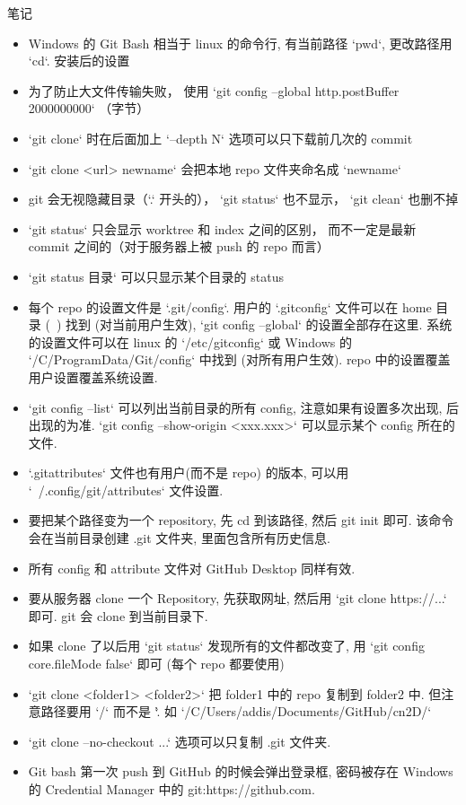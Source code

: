 笔记
\begin{itemize}
\item Windows 的 Git Bash 相当于 linux 的命令行, 有当前路径 `pwd`, 更改路径用 `cd`.
安装后的设置
\item 为了防止大文件传输失败， 使用 `git config --global http.postBuffer 2000000000` （字节）
\item `git clone` 时在后面加上 `--depth N` 选项可以只下载前几次的 commit
\item `git clone <url> newname` 会把本地 repo 文件夹命名成 `newname`
\item git 会无视隐藏目录（`.` 开头的）， `git status` 也不显示， `git clean` 也删不掉
\item `git status` 只会显示 worktree 和 index 之间的区别， 而不一定是最新 commit 之间的（对于服务器上被 push 的 repo 而言）
\item `git status 目录` 可以只显示某个目录的 status
\item 每个 repo 的设置文件是 `.git/config`. 用户的 `.gitconfig` 文件可以在 home 目录 (~) 找到 (对当前用户生效), `git config --global` 的设置全部存在这里. 系统的设置文件可以在 linux 的 `/etc/gitconfig` 或 Windows 的 `/C/ProgramData/Git/config` 中找到 (对所有用户生效). repo 中的设置覆盖用户设置覆盖系统设置.
\item `git config --list` 可以列出当前目录的所有 config, 注意如果有设置多次出现, 后出现的为准. `git config --show-origin <xxx.xxx>` 可以显示某个 config 所在的文件.
\item `.gitattributes` 文件也有用户(而不是 repo) 的版本, 可以用 `~/.config/git/attributes` 文件设置.
\item 要把某个路径变为一个 repository, 先 cd 到该路径, 然后 git init 即可. 该命令会在当前目录创建 .git 文件夹, 里面包含所有历史信息.
\item 所有 config 和 attribute 文件对 GitHub Desktop 同样有效.
\item 要从服务器 clone 一个 Repository, 先获取网址, 然后用 `git clone https://...` 即可. git 会 clone 到当前目录下.
\item 如果 clone 了以后用 `git status` 发现所有的文件都改变了, 用 `git config core.fileMode false` 即可 (每个 repo 都要使用)
\item `git clone <folder1> <folder2>` 把 folder1 中的 repo 复制到 folder2 中. 但注意路径要用 `/` 而不是 `\`. 如 `/C/Users/addis/Documents/GitHub/cn2D/`
\item `git clone --no-checkout ...` 选项可以只复制 .git 文件夹.
\item Git bash 第一次 push 到 GitHub 的时候会弹出登录框, 密码被存在 Windows 的 Credential Manager 中的 git:https://github.com.

\end{itemize}
